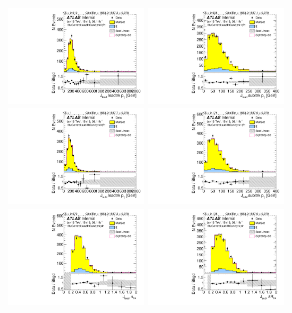 \begin{figure}[htbp!]
\begin{center}
\includegraphics[width=0.32\textwidth,angle=-90]{figures/boosted/Control/b77_ThreeTag_Control_leadHCand_trk0_Pt.pdf}
\includegraphics[width=0.32\textwidth,angle=-90]{figures/boosted/Control/b77_ThreeTag_Control_leadHCand_trk1_Pt.pdf}\\
\includegraphics[width=0.32\textwidth,angle=-90]{figures/boosted/Control/b77_ThreeTag_Control_sublHCand_trk0_Pt.pdf}
\includegraphics[width=0.32\textwidth,angle=-90]{figures/boosted/Control/b77_ThreeTag_Control_sublHCand_trk1_Pt.pdf}\\
\includegraphics[width=0.32\textwidth,angle=-90]{figures/boosted/Control/b77_ThreeTag_Control_leadHCand_trk_dr.pdf}
\includegraphics[width=0.32\textwidth,angle=-90]{figures/boosted/Control/b77_ThreeTag_Control_sublHCand_trk_dr.pdf}

\end{center}
\end{figure}
